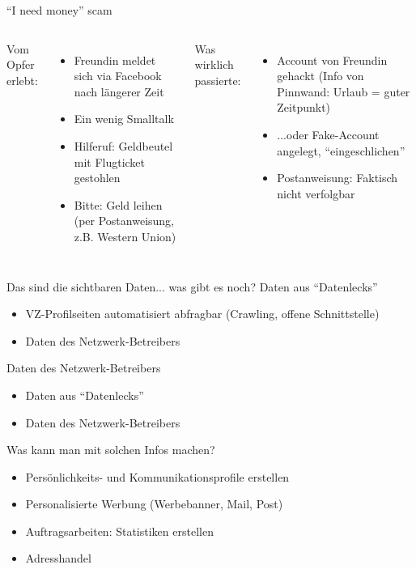 \begin{frame}{"`I need money"' scam}
	\begin{columns}[t]
		Vom Opfer erlebt:
		\begin{itemize}
			\item Freundin meldet sich via Facebook nach längerer Zeit
			\item Ein wenig Smalltalk
			\item<2-> Hilferuf: Geldbeutel mit Flugticket gestohlen
			\item<2-> Bitte: Geld leihen (per Postanweisung, z.B. Western Union)
		\end{itemize}
		Was wirklich passierte:
		\begin{itemize}
			\item<3-> Account von Freundin gehackt (Info von Pinnwand: Urlaub = guter Zeitpunkt)
			\item<3-> ...oder Fake-Account angelegt, "`eingeschlichen"'
			\item<3-> Postanweisung: Faktisch nicht verfolgbar
		\end{itemize}
	\end{columns}
\end{frame}

\begin{frame}{Das sind die sichtbaren Daten... was gibt es noch?}
	Daten aus "`Datenlecks"'
	\begin{itemize}
		\item VZ-Profilseiten automatisiert abfragbar (Crawling, offene Schnittstelle)
		\item Daten des Netzwerk-Betreibers
	\end{itemize}
	Daten des Netzwerk-Betreibers
	\begin{itemize}
		\item Daten aus "`Datenlecks"'
		\item Daten des Netzwerk-Betreibers
	\end{itemize}
\end{frame}

\begin{frame}{Was kann man mit solchen Infos machen?}
	\begin{itemize}
		\item Persönlichkeits- und Kommunikationsprofile erstellen
		\item Personalisierte Werbung (Werbebanner, Mail, Post)
		\item Auftragsarbeiten: Statistiken erstellen
		\item Adresshandel
	\end{itemize}
\end{frame}

